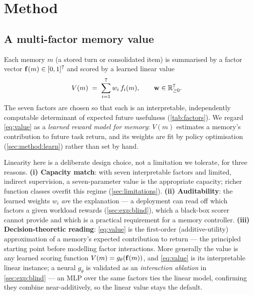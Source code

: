 \section{Method}
\label{sec:method}

\subsection{A multi-factor memory value}
\label{sec:method:value}

Each memory $m$ (a stored turn or consolidated item) is summarised by a
factor vector $\mathbf{f}(m)\in[0,1]^7$ and scored by a learned linear value
\begin{equation}
V(m) \;=\; \sum_{i=1}^{7} w_i\, f_i(m),
\qquad \mathbf{w} \in \mathbb{R}_{\ge 0}^{7}.
\label{eq:value}
\end{equation}
The seven factors are chosen so that each is an interpretable,
independently computable determinant of expected future usefulness
(\cref{tab:factors}). We regard \cref{eq:value} as a \emph{learned reward
model for memory}: $V(m)$ estimates a memory's contribution to future
task return, and its weights are fit by policy optimisation
(\cref{sec:method:learn}) rather than set by hand.

Linearity here is a deliberate design choice, not a limitation we
tolerate, for three reasons. \textbf{(i) Capacity match}: with seven
interpretable factors and limited, indirect supervision, a
seven-parameter value is the appropriate capacity; richer function
classes overfit this regime (\cref{sec:limitations}). \textbf{(ii)
Auditability}: the learned weights $w_i$ \emph{are} the explanation --- a
deployment can read off which factors a given workload rewards
(\cref{sec:exp:blind}), which a black-box scorer cannot provide and which
is a practical requirement for a memory controller. \textbf{(iii)
Decision-theoretic reading}: \cref{eq:value} is the first-order
(additive-utility) approximation of a memory's expected contribution to
return --- the principled starting point before modelling factor
interactions. More generally the value is any learned scoring function
$V(m)=g_\theta(\mathbf{f}(m))$, and \cref{eq:value} is its interpretable linear
instance; a neural $g_\theta$ is validated as an \emph{interaction
ablation} in \cref{sec:exp:blind} --- an MLP over the same factors ties
the linear model, confirming they combine near-additively, so the linear
value stays the default.

